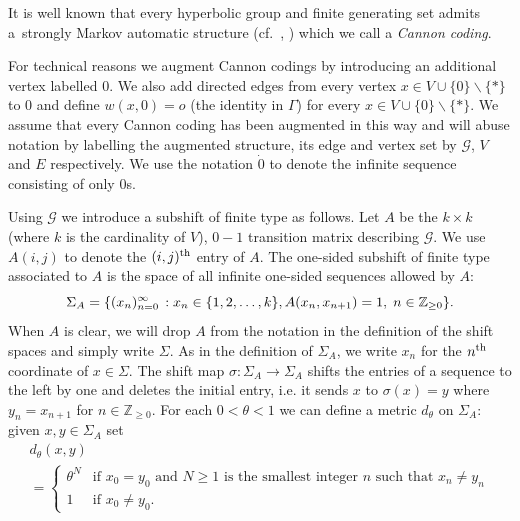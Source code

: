 \documentclass[AHL,Unicode,longabstracts,published]{cedram}
\renewcommand{\SS}{\Sigma}
\newcommand{\Gc}{\mathcal{G}}
\newcommand{\Z}{\mathbb{Z}}
\let\originalleft\left
\let\originalright\right
\renewcommand{\left}{\mathopen{}\mathclose\bgroup\originalleft}
\renewcommand{\right}{\aftergroup\egroup\originalright}
\newcounter{setofcase}
\newcounter{case}[setofcase]
\theoremstyle{plain}
\begin{document}
It is well known that every hyperbolic group and finite generating set admits a~strongly Markov automatic structure (cf.~\cite{GhysdelaHarpe}, \cite[Section~3.2]{Calegari}) which we call a \emph{Cannon coding}.

For technical reasons we augment Cannon codings by introducing an additional vertex labelled $0$. We also add directed edges from every vertex $x \in V \cup \{0\} \backslash \{\ast\}$ to $0$ and define $w(x,0) = o$ (the identity in $\Gamma$) for every $x \in V \cup \{0\} \backslash \{\ast\}$. We assume that every Cannon coding has been augmented in this way and will abuse notation by labelling the augmented structure, its edge and vertex set by $\Gc$, $V$ and $E$ respectively. We use the notation $\dot{0}$ to denote the infinite sequence consisting of only $0$s.

Using $\Gc$ we introduce a subshift of finite type as follows. Let $A$ be the $k \times k$ (where $k$ is the cardinality of $V$), $0-1$ transition matrix describing $\Gc$. We use $A(i,j)$ to denote the $(i,j)^{\rm th}$ entry of $A$. The one-sided subshift of finite type associated to $A$ is the space of all infinite one-sided sequences allowed by $A$:
\[
\Sigma_A = \left\{(x_n)_{n=0}^{\infty} \,: x_n \in \{1,2,\dots,k\}, A(x_n,x_{n+1})=1, \; n \in \Z_{\ge 0}\right\}.
\]
When $A$ is clear, we will drop $A$ from the notation in the definition of the shift spaces and simply write $\SS$. As in the definition of $\Sigma_A$, we write $x_n$ for the $n^{\rm th}$ coordinate of $x \in \Sigma$. The shift map $\sigma: \Sigma_A \rightarrow \Sigma_A$ shifts the entries of a sequence to the left by one and deletes the initial entry, i.e. it sends $x$ to $\sigma(x) = y$ where $y_n=x_{n+1}$ for $n \in \Z_{\ge 0}$. For each $0<\theta <1$ we can define a metric $d_\theta$ on $\Sigma_A$: given $x,y \in
\Sigma_A$ set
\begin{multline}
d_\theta(x,y)\\
=\begin{cases}
\theta^{N} &\text{if $x_0 = y_0$ and $N \ge 1$ is the smallest integer $n$ such that $x_n \neq y_n$} \\
1 &\text{if $x_0 \neq y_0$}.
\end{cases}
\end{multline}
\end{document}
